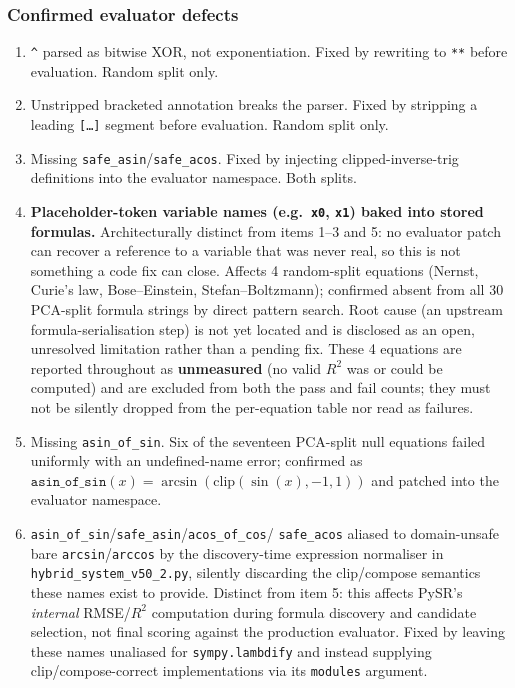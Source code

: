 \documentclass[twoside,11pt]{article}
\newcommand{\Rsq}{R^{2}}
\begin{document}
\subsubsection*{Confirmed evaluator defects}\label{sec:feynman30-defects}

\begin{enumerate}
\item \texttt{\textasciicircum} parsed as bitwise XOR, not exponentiation.
  Fixed by rewriting to \texttt{**} before evaluation. Random split only.
\item Unstripped bracketed annotation breaks the parser. Fixed by stripping
  a leading \texttt{[\ldots]} segment before evaluation. Random split only.
\item Missing \texttt{safe\_asin}/\texttt{safe\_acos}. Fixed by injecting
  clipped-inverse-trig definitions into the evaluator namespace. Both
  splits.
\item \textbf{Placeholder-token variable names (e.g.\ \texttt{x0},
  \texttt{x1}) baked into stored formulas.} Architecturally distinct from
  items 1--3 and 5: no evaluator patch can recover a reference to a
  variable that was never real, so this is not something a code fix can
  close. Affects 4 random-split equations (Nernst,
  Curie's law, Bose--Einstein, Stefan--Boltzmann); confirmed absent from
  all 30 PCA-split formula strings by direct pattern search. Root cause (an
  upstream formula-serialisation step) is not yet located and is disclosed
  as an open, unresolved limitation rather than a pending fix. These 4
  equations are reported throughout as \textbf{unmeasured} (no valid
  $\Rsq$ was or could be computed) and are excluded from both the pass and
  fail counts; they must not be silently dropped from the per-equation
  table nor read as failures.
\item Missing \texttt{asin\_of\_sin}. Six of the seventeen PCA-split null
  equations failed uniformly with an undefined-name error; confirmed as
  $\texttt{asin\_of\_sin}(x)=\arcsin(\mathrm{clip}(\sin(x),-1,1))$ and
  patched into the evaluator namespace.
\item \texttt{asin\_of\_sin}/\texttt{safe\_asin}/\texttt{acos\_of\_cos}/
  \texttt{safe\_acos} aliased to domain-unsafe bare
  \texttt{arcsin}/\texttt{arccos} by the discovery-time expression
  normaliser in \texttt{hybrid\_system\_v50\_2.py}, silently discarding the
  clip/compose semantics these names exist to provide. Distinct from item
  5: this affects PySR's \emph{internal} RMSE/$\Rsq$ computation during
  formula discovery and candidate selection, not final scoring against the
  production evaluator. Fixed by leaving these names unaliased for
  \texttt{sympy.lambdify} and instead supplying clip/compose-correct
  implementations via its \texttt{modules} argument.
\end{enumerate}
\end{document}
